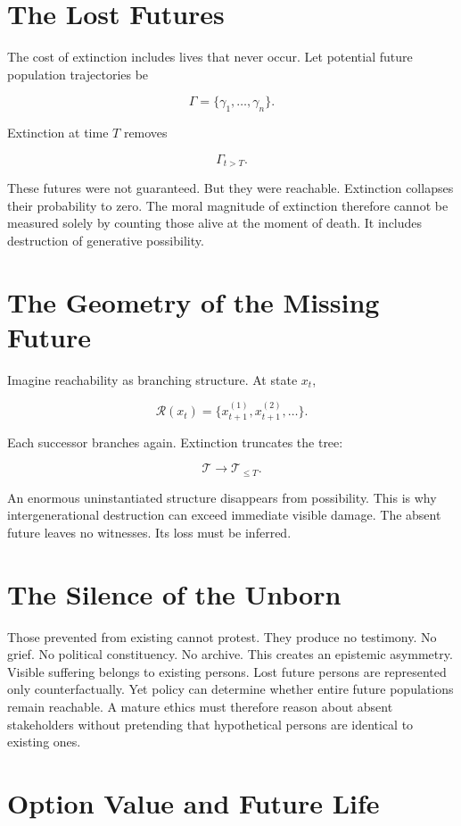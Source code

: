 \documentclass[11pt,oneside]{book}
\theoremstyle{definition}
\theoremstyle{remark}
\newcommand{\R}{\mathcal{R}}
\begin{document}
\section{The Lost Futures}

The cost of extinction includes lives that never occur. Let potential future population trajectories
be

\[
\Gamma = \{\gamma_1,\ldots,\gamma_n\}.
\]

Extinction at time \(T\) removes

\[
\Gamma_{t>T}.
\]

These futures were not guaranteed. But they were reachable. Extinction collapses their probability
to zero. The moral magnitude of extinction therefore cannot be measured solely by counting those
alive at the moment of death. It includes destruction of generative possibility.

\section{The Geometry of the Missing Future}

Imagine reachability as branching structure. At state \(x_t\),

\[
\R(x_t) = \{x_{t+1}^{(1)},x_{t+1}^{(2)},\ldots\}.
\]

Each successor branches again. Extinction truncates the tree:

\[
\mathcal T \rightarrow \mathcal T_{\leq T}.
\]

An enormous uninstantiated structure disappears from possibility. This is why intergenerational
destruction can exceed immediate visible damage. The absent future leaves no witnesses. Its loss
must be inferred.

\section{The Silence of the Unborn}

Those prevented from existing cannot protest. They produce no testimony. No grief. No political
constituency. No archive. This creates an epistemic asymmetry. Visible suffering belongs to existing
persons. Lost future persons are represented only counterfactually. Yet policy can determine whether
entire future populations remain reachable. A mature ethics must therefore reason about absent
stakeholders without pretending that hypothetical persons are identical to existing ones.

\section{Option Value and Future Life}
\end{document}
